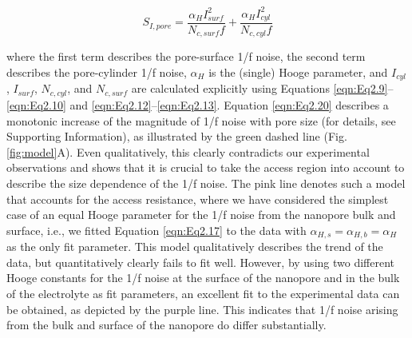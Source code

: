\begin{equation}\label{eqn:Eq2.20}
S_{I,pore}=
\frac{\alpha_{H} I_{surf}^2}{N_{c,surf}f}+
\frac{\alpha_{H} I_{cyl}^2}{N_{c,cyl}f}
\end{equation}

\noindent where the first term describes the pore-surface 1/f noise, the second term describes the pore-cylinder 1/f noise, $\alpha_H$ is the (single) Hooge parameter, and $I_{cyl}$, $I_{surf}$, $N_{c,cyl}$, and $N_{c,surf}$ are calculated explicitly using Equations \ref{eqn:Eq2.9}–\ref{eqn:Eq2.10} and \ref{eqn:Eq2.12}–\ref{eqn:Eq2.13}. Equation \ref{eqn:Eq2.20} describes a monotonic increase of the magnitude of 1/f noise with pore size (for details, see Supporting Information), as illustrated by the green dashed line (Fig.\ref{fig:model}A). Even qualitatively, this clearly contradicts our experimental observations and shows that it is crucial to take the access region into account to describe the size dependence of the 1/f noise. The pink line denotes such a model that accounts for the access resistance, where we have considered the simplest case of an equal Hooge parameter for the 1/f noise from the nanopore bulk and surface, i.e., we fitted Equation \ref{eqn:Eq2.17} to the data with $\alpha_{H,s}=\alpha_{H,b}=\alpha_H$ as the only fit parameter. This model qualitatively describes the trend of the data, but quantitatively clearly fails to fit well. However, by using two different Hooge constants for the 1/f noise at the surface of the nanopore and in the bulk of the electrolyte as fit parameters, an excellent fit to the experimental data can be obtained, as depicted by the purple line. This indicates that 1/f noise arising from the bulk and surface of the nanopore do differ substantially. 

